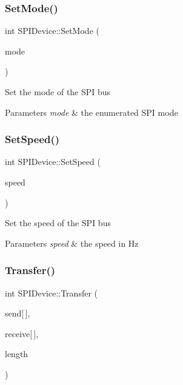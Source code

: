 \subsubsection{\texorpdfstring{Set\+Mode()}{SetMode()}}
{\footnotesize\ttfamily int S\+P\+I\+Device\+::\+Set\+Mode (\begin{DoxyParamCaption}\item[{\hyperlink{classcubesat_1_1SPIDevice_a68ceaba3194595c2f995f052a337a6d2}{S\+P\+I\+Device\+::\+S\+P\+I\+M\+O\+DE}}]{mode }\end{DoxyParamCaption})\hspace{0.3cm}{\ttfamily [virtual]}}

Set the mode of the S\+PI bus 
\begin{DoxyParams}{Parameters}
{\em mode} & the enumerated S\+PI mode \\
\hline
\end{DoxyParams}
\mbox{\label{classcubesat_1_1SPIDevice_a43c7d61f64052e2c0a88bcf02a800f89}} 
\subsubsection{\texorpdfstring{Set\+Speed()}{SetSpeed()}}
{\footnotesize\ttfamily int S\+P\+I\+Device\+::\+Set\+Speed (\begin{DoxyParamCaption}\item[{uint32\+\_\+t}]{speed }\end{DoxyParamCaption})\hspace{0.3cm}{\ttfamily [virtual]}}

Set the speed of the S\+PI bus 
\begin{DoxyParams}{Parameters}
{\em speed} & the speed in Hz \\
\hline
\end{DoxyParams}
\mbox{\label{classcubesat_1_1SPIDevice_abea00136e626117421b2fd62d39404a9}} 
\subsubsection{\texorpdfstring{Transfer()}{Transfer()}}
{\footnotesize\ttfamily int S\+P\+I\+Device\+::\+Transfer (\begin{DoxyParamCaption}\item[{unsigned char}]{send\mbox{[}$\,$\mbox{]},  }\item[{unsigned char}]{receive\mbox{[}$\,$\mbox{]},  }\item[{int}]{length }\end{DoxyParamCaption})\hspace{0.3cm}{\ttfamily [virtual]}}

